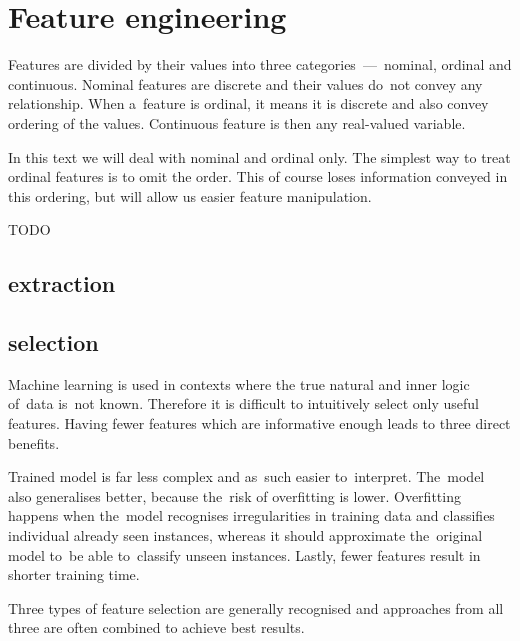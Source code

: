 \chapter{Feature engineering}



Features are divided by their values into three categories~---~nominal, ordinal and continuous. Nominal features are discrete and their values do~not convey any relationship. When a~feature is ordinal, it means it is discrete and also convey ordering of the values. Continuous feature is then any real-valued variable.

In this text we will deal with nominal and ordinal only. The simplest way to treat ordinal features is to omit the order. This of course loses information conveyed in this ordering, but will allow us easier feature manipulation.


\begin{defn}\label{feature_vector} TODO
\end{defn}

\section{extraction}



\section{selection}

Machine learning is used in contexts where the true natural and inner logic of~data is~not known. Therefore it is difficult to intuitively select only useful features. Having fewer features which are informative enough leads to three direct benefits.

Trained model is far less complex and as~such easier to~interpret. The~model also generalises better, because the~risk of overfitting is lower. Overfitting happens when the~model recognises irregularities in training data and classifies individual already seen instances, whereas it should approximate the~original model to~be able to~classify unseen instances. Lastly, fewer features result in shorter training time.

Three types of feature selection are generally recognised and approaches from all three are often combined to achieve best results.

